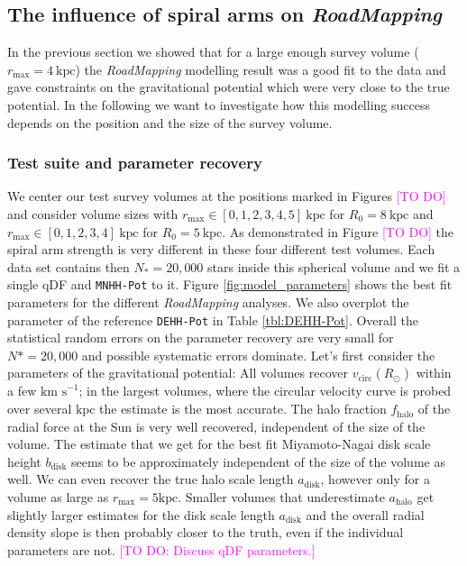 \documentclass[iop,revtex4,numberedappendix,appendixfloats]{emulateapj}
\newcommand{\RM}{{\sl RoadMapping}}
\newcommand{\Wilma}[1]{\textcolor{Magenta}{#1}}
\begin{document}
\subsection{The influence of spiral arms on \RM{}}

In the previous section we showed that for a large enough survey volume ($r_\text{max}=4~\text{kpc}$) the \RM{} modelling result was a good fit to the data and gave constraints on the gravitational potential which were very close to the true potential. In the following we want to investigate how this modelling success depends on the position and the size of the survey volume.

\subsubsection{Test suite and parameter recovery}

We center our test survey volumes at the positions marked in Figures \Wilma{[TO DO]} and consider volume sizes with $r_\text{max} \in [0,1,2,3,4,5]~\text{kpc}$ for $R_0 = 8~\text{kpc}$ and $r_\text{max} \in [0,1,2,3,4]~\text{kpc}$ for $R_0 = 5~\text{kpc}$. As demonstrated in Figure \Wilma{[TO DO]} the spiral arm strength is very different in these four different test volumes. Each data set contains then $N_*=20,000$ stars inside this spherical volume and we fit a single qDF and \texttt{MNHH-Pot} to it. Figure \ref{fig:model_parameters} shows the best fit parameters for the different \RM{} analyses. We also overplot the parameter of the reference \texttt{DEHH-Pot} in Table \ref{tbl:DEHH-Pot}. Overall the statistical random errors on the parameter recovery are very small for $N*=20,000$ and possible systematic errors dominate. 
Let's first consider the parameters of the gravitational potential: All volumes recover $v_\text{circ}(R_\odot)$ within a few $\text{km s}^{-1}$; in the largest volumes, where the circular velocity curve is probed over several $\text{kpc}$ the estimate is the most accurate. The halo fraction $f_\text{halo}$ of the radial force at the Sun is very well recovered, independent of the size of the volume. The estimate that we get for the best fit Miyamoto-Nagai disk scale height $b_\text{disk}$ seems to be approximately independent of the size of the volume as well. We can even recover the true halo scale length $a_\text{disk}$, however only for a volume as large as $r_\text{max}=5\text{kpc}$. Smaller volumes that underestimate $a_\text{halo}$ get slightly larger estimates for the disk scale length $a_\text{disk}$ and the overall radial density slope is then probably closer to the truth, even if the individual parameters are not.
\Wilma{[TO DO: Discuss qDF parameters.]}
\end{document}
